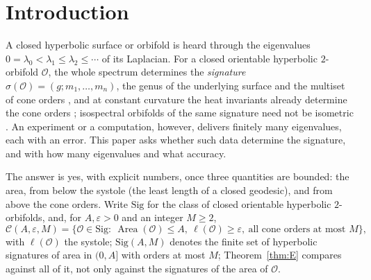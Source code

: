\documentclass[pdflatex,sn-mathphys-num]{sn-jnl}
\theoremstyle{thmstyleone}%
\theoremstyle{thmstylethree}%
\newcommand{\Orb}{\mathcal{O}}
\newcommand{\Cl}{\mathcal{C}}
\newcommand{\Sig}{\mathrm{Sig}}
\newcommand{\Area}{\operatorname{Area}}
\begin{document}

\maketitle

\section{Introduction}\label{sec:intro}

A closed hyperbolic surface or orbifold is heard through the eigenvalues $0=\lambda_0<\lambda_1\le\lambda_2\le\cdots$ of its Laplacian. For a closed orientable hyperbolic $2$-orbifold $\Orb$, the whole spectrum determines the \emph{signature} $\sigma(\Orb)=(g;m_1,\dots,m_n)$, the genus of the underlying surface and the multiset of cone orders \cite[Thm~1.1, Prop.~3.3]{drydenstrohmaier2009}, and at constant curvature the heat invariants already determine the cone orders \cite[Thm~4.20, Cor.~4.21(iv)]{ucar2017}; isospectral orbifolds of the same signature need not be isometric \cite[Thm~A]{linowitzvoight2015}. An experiment or a computation, however, delivers finitely many eigenvalues, each with an error. This paper asks whether such data determine the signature, and with how many eigenvalues and what accuracy.

The answer is yes, with explicit numbers, once three quantities are bounded: the area, from below the systole (the least length of a closed geodesic), and from above the cone orders. Write $\Sig$ for the class of closed orientable hyperbolic $2$-orbifolds, and, for $A,\varepsilon>0$ and an integer $M\ge2$,
\[
  \Cl(A,\varepsilon,M)=\{\Orb\in\Sig:\ \Area(\Orb)\le A,\ \ell(\Orb)\ge\varepsilon,\ \text{all cone orders at most }M\},
\]
with $\ell(\Orb)$ the systole; $\Sig(A,M)$ denotes the finite set of hyperbolic signatures of area in $(0,A]$ with orders at most $M$; Theorem~\ref{thm:E} compares against all of it, not only against the signatures of the area of $\Orb$.
\end{document}
